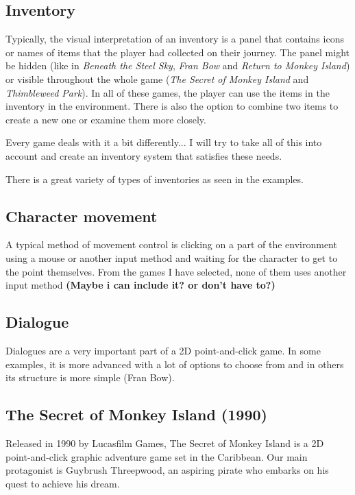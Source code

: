 \subsection{Inventory}
Typically, the visual interpretation of an inventory is a panel that contains icons or names of items that the player had collected on their journey. The panel might be hidden (like in \textit{Beneath the Steel Sky}, \textit{Fran Bow} and \textit{Return to Monkey Island}) or visible throughout the whole game (\textit{The Secret of Monkey Island} and \textit{Thimbleweed Park}). In all of these games, the player can use the items in the inventory in the environment. There is also the option to combine two items to create a new one or examine them more closely. 

Every game deals with it a bit differently... 
I will try to take all of this into account and create an inventory system that satisfies these needs.

There is a great variety of types of inventories as seen in the examples. 

\subsection{Character movement}
A typical method of movement control is clicking on a part of the environment using a mouse or another input method and waiting for the character to get to the point themselves. From the games I have selected, none of them uses another input method  \textbf{(Maybe i can include it? or don't have to?)}


\subsection{Dialogue}
Dialogues are a very important part of a 2D point-and-click game. In some examples, it is more advanced with a lot of options to choose from and in others its structure is more simple (Fran Bow).  







\subsection{The Secret of Monkey Island (1990)}
Released in 1990 by Lucasfilm Games, The Secret of Monkey Island is a 2D point-and-click graphic adventure game set in the Caribbean. Our main protagonist is Guybrush Threepwood, an aspiring pirate who embarks on his quest to achieve his dream.

